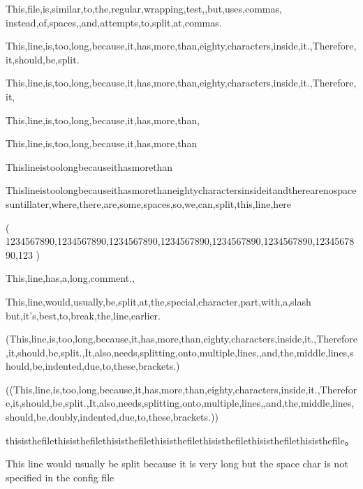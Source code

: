 \documentclass{article}
\begin{document}
This,file,is,similar,to,the,regular,wrapping,test,,but,uses,commas,
instead,of,spaces,,and,attempts,to,split,at,commas.

This,line,is,too,long,because,it,has,more,than,eighty,characters,inside,it.,Therefore,it,should,be,split.

This,line,is,too,long,because,it,has,more,than,eighty,characters,inside,it.,Therefore,it,%

This,line,is,too,long,because,it,has,more,than,%

This,line,is,too,long,because,it,has,more,than%

Thislineistoolongbecauseithasmorethan%

Thislineistoolongbecauseithasmorethaneightycharactersinsideitandtherearenospacesuntillater,where,there,are,some,spaces,so,we,can,split,this,line,here

(
1234567890,1234567890,1234567890,1234567890,1234567890,1234567890,1234567890,123
)

This,line,has,a,long,comment.,%


This,line,would,usually,be,split,at,the,special,character,part,with,a,slash\,but,it's,best,to,break,the,line,earlier.

(This,line,is,too,long,because,it,has,more,than,eighty,characters,inside,it.,Therefore,it,should,be,split.,It,also,needs,splitting,onto,multiple,lines,,and,the,middle,lines,should,be,indented,due,to,these,brackets.)

((This,line,is,too,long,because,it,has,more,than,eighty,characters,inside,it.,Therefore,it,should,be,split.,It,also,needs,splitting,onto,multiple,lines,,and,the,middle,lines,should,be,doubly,indented,due,to,these,brackets.))

thisisthefilethisisthefilethisisthefilethisisthefilethisisthefilethisisthefilethisisthefile。

This line would usually be split because it is very long but the space char is not specified in the config file
\end{document}
